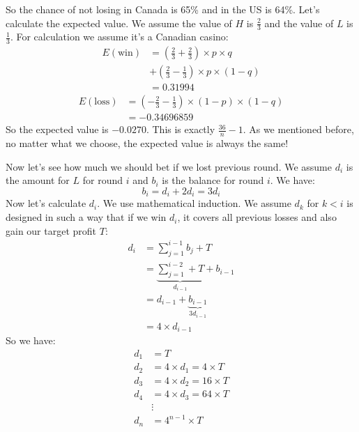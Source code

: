 \documentclass{book}
\begin{document}
	\par
	So the chance of not losing in Canada is 65\% and in the US is 64\%. Let's calculate the expected value. We assume the value of $H$ is $\frac{2}{3}$ and the value of $L$ is $\frac{1}{3}$. For calculation we assume it's a Canadian casino:
	\begin{equation*}
		\begin{split}
			E(\text{win}) &= (\frac{2}{3} + \frac{2}{3}) \times p \times q \\
			&+ (\frac{2}{3} - \frac{1}{3}) \times p \times (1 - q) \\
			&= 0.31994
		\end{split}
	\end{equation*}
	\begin{equation*}
		\begin{split}
			E(\text{loss}) &= (-\frac{2}{3} - \frac{1}{3}) \times (1 - p) \times (1 - q) \\
			&= -0.34696859
		\end{split}
	\end{equation*}
	So the expected value is $-0.0270$. This is exactly $\frac{36}{n} - 1$. As we mentioned before, no matter what we choose, the expected value is always the same!
	\par Now let's see how much we should bet if we lost previous round. We assume $d_i$ is the amount for $L$ for round $i$ and $b_i$ is the balance for round $i$. We have:
	\begin{equation*}
		b_i = d_i + 2d_i = 3d_i
	\end{equation*}
	Now let's calculate $d_i$. We use mathematical induction. We assume $d_k$ for $k < i$ is designed in such a way that if we win $d_i$, it covers all previous losses and also gain our target profit $T$:
	\begin{equation*}
		\begin{split}
			d_i &= \sum_{j = 1}^{i - 1}{b_j} + T \\
			&= \underbrace{\sum_{j = 1}^{i - 2} + T}_{d_{i - 1}} + b_{i - 1} \\
			&= d_{i - 1} + \underbrace{b_{i - 1}}_{3d_{i - 1}} \\
			&= 4 \times d_{i - 1}
		\end{split}
	\end{equation*}
	So we have:
	\begin{equation*}
		\begin{split}
			d_1 &= T \\
			d_2 &= 4 \times d_1 = 4 \times T \\
			d_3 &= 4 \times d_2 = 16 \times T \\
			d_4 &= 4 \times d_3 = 64 \times T \\
			&\vdots \\
			d_n &= 4^{n - 1} \times T
		\end{split}
	\end{equation*}
\end{document}
